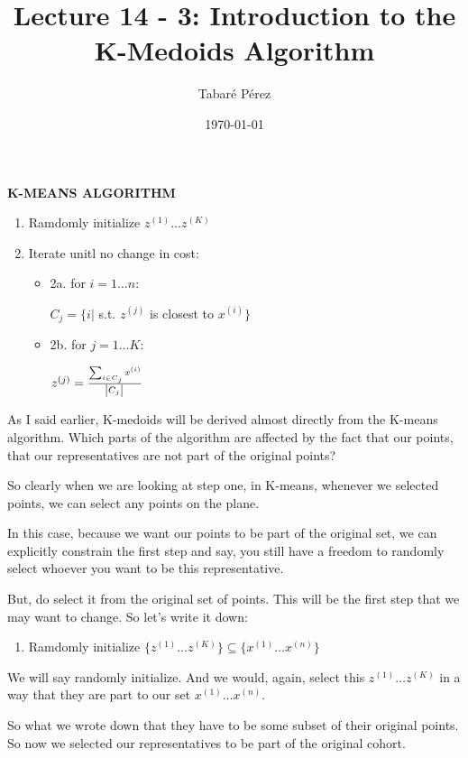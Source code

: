 \documentclass[a4paper, 12pt]{article}
\author{Tabaré Pérez}
\date{\today}
\title{Lecture 14 - 3: Introduction to the K-Medoids Algorithm}
\begin{document}
\maketitle
\textbf{K-MEANS ALGORITHM}

\begin{enumerate}
\item Ramdomly initialize \(z^{(1)} \ldots z^{(K)}\)
\item Iterate unitl no change in cost:
\begin{itemize}
\item 2a. for \(i=1 \ldots n\):

\(C_j = \{i|\) s.t. \(z^{(j)}\) is closest to \(x^{(i)}\}\)

\item 2b. for \(j=1 \ldots K\):

\(z^{(j)} = \frac{\sum_{i \in C_j} x^{(i)}}{\abs{C_j}}\)
\end{itemize}
\end{enumerate}

As I said earlier, K-medoids will be derived almost directly from the K-means
algorithm. Which parts of the algorithm are affected by the fact that our
points, that our representatives are not part of the original points?

So clearly when we are looking at step one, in K-means, whenever we selected
points, we can select any points on the plane.

In this case, because we want our points to be part of the original set, we can
explicitly constrain the first step and say, you still have a freedom to
randomly select whoever you want to be this representative.

But, do select it from the original set of points. This will be the first step
that we may want to change. So let's write it down:

\begin{enumerate}
\item Ramdomly initialize \(\{z^{(1)} \ldots z^{(K)}\} \subseteq \{x^{(1)} \ldots x^{(n)}\}\)
\end{enumerate}

We will say randomly initialize. And we would, again, select this \(z^{(1)} \ldots
z^{(K)}\) in a way that they are part to our set \(x^{(1)} \ldots x^{(n)}\).

So what we wrote down that they have to be some subset of their original points.
So now we selected our representatives to be part of the original cohort.
\end{document}

